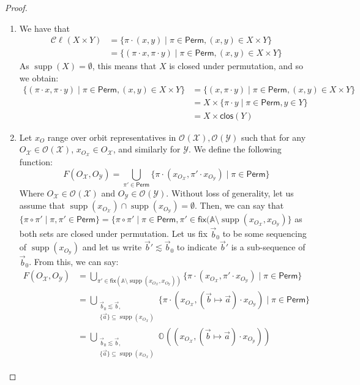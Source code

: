 \documentclass[10pt,a4paper]{article}
\theoremstyle{definition}
\theoremstyle{remark}
\DeclareMathOperator{\supp}{supp}
\newcommand\Xcal{\mathcal{X}}
\newcommand\Ycal{\mathcal{Y}}
\newcommand\Atoms{\mathbb{A}}
\newcommand\orb[1][]{\mathcal{O}_{#1}}
\newcommand\orbs[1][]{\mathbb{O}_{#1}}
\newcommand\cls[1]{\mathcal{C}\!\ell_{#1}}
\newcommand\fix{\mathsf{fix}}
\newcommand{\move}[2]{(#1\mapsto#2)}
\newcommand{\clos}[0]{\mathsf{clos}}
\newcommand\Perm[0]{{\mathsf{Perm}}}
\begin{document}
\begin{proof}
\begin{enumerate}
	\item We have that 
	\begin{align*}
		\cls{}(X \times Y) &= \{\pi \cdot (x, y) \mid \pi \in \Perm, (x,y) \in X \times Y\}
		\\ &= \{(\pi \cdot x, \pi \cdot y) \mid \pi \in \Perm, (x, y) \in X \times Y\}
	\end{align*} 
	As $\supp(X) = \emptyset$, this means that $X$ is closed under permutation, and so we obtain:
	\begin{align*}
		\{(\pi \cdot x, \pi \cdot y) \mid \pi \in \Perm, (x, y) \in X \times Y\} &= \{(x, \pi \cdot y) \mid \pi \in \Perm, (x, y) \in X \times Y\}\\
		&= X \times \{\pi \cdot y \mid \pi \in \Perm, y \in Y\} \\ &= X\times \clos(Y)
	\end{align*}
	\item Let $x_{O}$ range over orbit representatives in $\orb(\Xcal), \orb(\Ycal)$ such that for any $O_\Xcal \in \orb(\Xcal)$, $x_{O_\Xcal} \in O_\Xcal$, and similarly for $\Ycal$.
	We define the following function:
	\[
	F(O_\Xcal, O_\Ycal) = \bigcup_{\pi' \in \Perm}\{\pi \cdot (x_{O_\Xcal}, \pi'\cdot x_{O_\Ycal}) \mid \pi \in \Perm\}
	\]
	Where $O_\Xcal \in \orb(\Xcal)$ and $O_\Ycal \in \orb(\Ycal)$. 
	Without loss of generality, let us assume that $\supp(x_{O_\Xcal}) \cap \supp(x_{O_\Ycal}) = \emptyset$. 
	Then, we can say that $\{\pi \circ \pi' \mid \pi, \pi' \in \Perm\} = \{\pi \circ \pi' \mid \pi \in \Perm, \pi' \in \fix(\Atoms \setminus \supp(x_{O_\Xcal}, x_{O_\Ycal})\}$ as both sets are closed under permutation.  
	Let us fix $\vec b_0$ to be some sequencing of $\supp(x_{O_\Ycal})$ and let us write $\vec b' \lesssim \vec b_0$ to indicate $\vec b'$ is a sub-sequence of $\vec b_0$.
	From this, we can say:
	\begin{align*}
		F(O_\Xcal, O_\Ycal) &= \bigcup_{\pi' \in \fix(\Atoms \setminus \supp(x_{O_\Xcal}, x_{O_\Ycal}))}\{\pi \cdot (x_{O_\Xcal}, \pi'\cdot x_{O_\Ycal}) \mid \pi \in \Perm\} \\
		&= \bigcup_{\substack{\vec b_0 \lesssim \vec b,\\ \{\vec a\} \subseteq \supp(x_{O_\Xcal})}} \{\pi \cdot (x_{O_\Xcal}, \move{\vec b}{\vec a}\cdot x_{O_\Ycal}) \mid \pi \in \Perm\} \\
		&= \bigcup_{\substack{\vec b_0 \lesssim \vec b,\\ \{\vec a\} \subseteq \supp(x_{O_\Xcal})}} \orbs((x_{O_\Xcal}, \move{\vec b}{\vec a}\cdot x_{O_\Ycal}))
	\end{align*}

\end{enumerate}
\end{proof}
\end{document}
